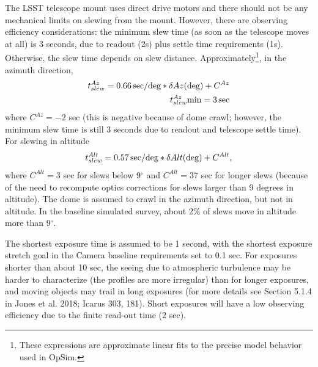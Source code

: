 \documentclass[DM,toc,usenatbib]{lsstdoc}
\begin{document}
The LSST telescope mount uses direct drive motors and there should not be any mechanical limits 
on slewing from the mount.  However, there are observing efficiency considerations: the minimum
slew time (as soon as the telescope moves at all) is 3 seconds, due to readout (2s) plus settle time requirements (1s). 
Otherwise, the slew time depends on slew distance. Approximately\footnote{These expressions are 
approximate linear fits to the precise model behavior used in OpSim.}, 
in the azimuth direction, 
\begin{eqnarray}
             t_{slew}^{Az} = 0.66 \, {\rm sec/deg} * \delta Az ({\rm deg}) + C^{Az} \\
             t_{slew}^{Az} {\rm min} = 3\, {\rm sec}
\end{eqnarray} 
where $C^{Az} = -2$ sec (this is negative because of dome crawl; however, the minimum
slew time is still 3 seconds due to readout and telescope settle time). For slewing in altitude
\begin{equation}
             t_{slew}^{Alt} = 0.57 \, {\rm sec/deg} * \delta Alt ({\rm deg}) + C^{Alt} ,  
\end{equation} 
where $C^{Alt} = 3$ sec for slews below 9$^\circ$ and $C^{Alt} = 37$ sec for longer slews (because 
of the need to recompute optics corrections for slews larger than 9 degrees in altitude). 
The dome is assumed to crawl in the azimuth direction, but not in altitude. 
In the baseline simulated survey, about 2\% of slews move
in altitude more than 9$^\circ$. 

The shortest exposure time is assumed to be 1 second, with the shortest exposure stretch goal in the Camera 
baseline requirements set to 0.1 sec. For exposures shorter than 
about 10 sec, the seeing due to atmospheric turbulence may be harder to characterize (the profiles are more
irregular) than for longer exposures, and moving objects may trail in long exposures (for more
details see Section 5.1.4 in Jones et al. 2018; Icarus 303, 181). Short exposures will have a low
observing efficiency due to the finite read-out time (2 sec). %
\end{document}
